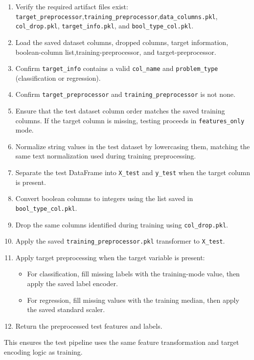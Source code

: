 \begin{enumerate}
  \item Verify the required artifact files exist: \texttt{target\_preprocessor},\texttt{training\_preprocessor},\texttt{data\_columns.pkl}, \texttt{col\_drop.pkl}, \texttt{target\_info.pkl}, and \texttt{bool\_type\_col.pkl}.
  \item Load the saved dataset columns, dropped columns, target information, boolean-column list,training-preprocessor, and target-preprocessor.
  \item Confirm \texttt{target\_info} contains a valid \texttt{col\_name} and \texttt{problem\_type} (classification or regression).
  \item Confirm \texttt{target\_preprocessor} and \texttt{training\_preprocessor} is not none.
  \item Ensure that the test dataset column order matches the saved training columns. If the target column is missing, testing proceeds in \texttt{features\_only} mode.
  \item Normalize string values in the test dataset by lowercasing them, matching the same text normalization used during training preprocessing.
  \item Separate the test DataFrame into \texttt{X\_test} and \texttt{y\_test} when the target column is present.
  \item Convert boolean columns to integers using the list saved in \texttt{bool\_type\_col.pkl}.
  \item Drop the same columns identified during training using \texttt{col\_drop.pkl}.
  \item Apply the saved \texttt{training\_preprocessor.pkl} transformer to \texttt{X\_test}.
  \item Apply target preprocessing when the target variable is present:
    \begin{itemize}
      \item For classification, fill missing labels with the training-mode value, then apply the saved label encoder.
      \item For regression, fill missing values with the training median, then apply the saved standard scaler.
    \end{itemize}
  \item Return the preprocessed test features and labels.
\end{enumerate}

This ensures the test pipeline uses the same feature transformation and target encoding logic as training.


